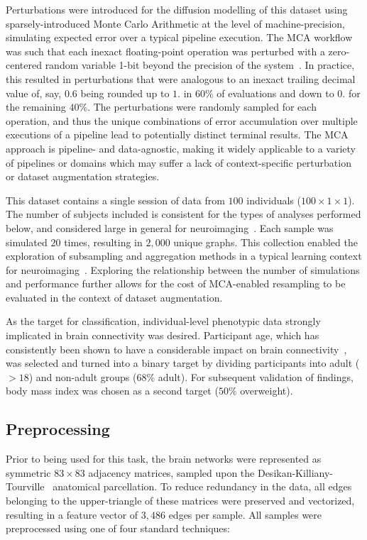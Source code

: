 \documentclass[10pt]{SelfArx} %
\newcommand{\new}[1]{\color{blue}#1\color{black}}
\begin{document}
\new{Perturbations were} introduced for \new{the diffusion modelling} of this dataset \new{using sparsely-introduced
Monte Carlo Arithmetic} at the level of machine-precision, simulating expected error over a typical pipeline execution.
\new{The MCA workflow was such that each inexact floating-point operation was perturbed with a zero-centered random
variable 1-bit beyond the precision of the system~\cite{Denis2016-wo,Parker1997-qq}. In practice, this resulted in
perturbations that were analogous to an inexact trailing decimal value of, say, $0.6$ being rounded up to $1.$ in
$60\%$ of evaluations and down to $0.$ for the remaining $40\%$. The perturbations were randomly sampled for each
operation, and thus the unique combinations of error accumulation over multiple executions of a pipeline lead to
potentially distinct terminal results. The MCA approach is pipeline- and data-agnostic, making it widely applicable to
a variety of pipelines or domains which may suffer a lack of context-specific perturbation or dataset augmentation
strategies.}

This dataset contains a single session of data from $100$ individuals ($100\times 1 \times1$). \new{The number of
subjects included is consistent for the types of analyses performed below, and considered large in general for
neuroimaging~\cite{neuroimagingsamplesize}.} Each sample was simulated $20$ times, resulting in $2,000$ unique graphs.
This collection enabled the exploration of subsampling and aggregation methods in a typical learning context for
neuroimaging~\cite{Dimitriadis2017-pd,Buchanan2014-pm}. Exploring the relationship between the number of simulations
and performance further allows for the cost of MCA-enabled resampling to be evaluated \new{in the context of} dataset
augmentation.

As the target for classification, individual-level phenotypic data strongly implicated in brain connectivity was
desired. Participant age, which has consistently been shown to have a considerable impact on brain
connectivity~\cite{Meier2012-ve,Wu2012-uc,Bookheimer2019-ti,Zhao2015-rm}, was selected and turned into a binary target
by dividing participants into adult ($>18$) and non-adult groups ($68\%$ adult). \new{For subsequent validation of
findings, body mass index was chosen as a second target ($50\%$ overweight).}

\subsection*{Preprocessing}
Prior to being used for this task, the brain networks were represented as symmetric $83 \times 83$ adjacency
matrices, sampled upon the Desikan-Killiany-Tourville~\cite{Klein2012-vi} anatomical parcellation. To reduce redundancy
in the data, all edges belonging to the upper-triangle of these matrices were preserved and vectorized, resulting in a
feature vector of $3,486$ edges per sample. All samples were preprocessed using one of four standard techniques:
\end{document}
